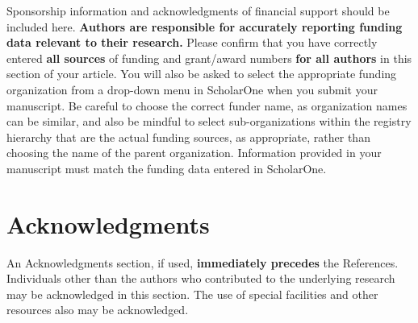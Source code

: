 \documentclass[journal]{new-aiaa}
\begin{document}
Sponsorship information and acknowledgments of financial support should be included here. \textbf{Authors are responsible for accurately reporting funding data relevant to their research.} Please confirm that you have correctly entered \textbf{all sources} of funding and grant/award numbers \textbf{for all authors} in this section of your article. You will also be asked to select the appropriate funding organization from a drop-down menu in ScholarOne when you submit your manuscript. Be careful to choose the correct funder name, as organization names can be similar, and also be mindful to select sub-organizations within the registry hierarchy that are the actual funding sources, as appropriate, rather than choosing the name of the parent organization. Information provided in your manuscript must match the funding data entered in ScholarOne.

\section*{Acknowledgments}
An Acknowledgments section, if used, \textbf{immediately precedes} the References. Individuals other than the authors who contributed to the underlying research may be acknowledged in this section. The use of special facilities and other resources also may be acknowledged. 



\end{document}
